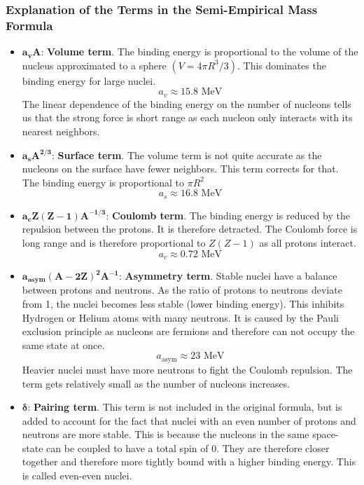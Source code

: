 \subsubsection{Explanation of the Terms in the Semi-Empirical Mass Formula}\label{sssec: Explenation of the Terms in the Semi-Empirical Mass Formula}
\begin{itemize}
    \item $\mathbf{a_vA}$: \textbf{Volume term}. The binding energy is proportional to the volume of the nucleus approximated to a sphere $\left(V = 4πR^3/3\right)$. This dominates the binding energy for large nuclei. 
    \begin{equation}
    a_v ≈ 15.8 \text{ MeV}
    \end{equation}
    The linear dependence of the binding energy on the number of nucleons tells us that the strong force is short range as each nucleon only interacts with its nearest neighbors. 
    \item $\mathbf{a_sA^{2 / 3}}$: \textbf{Surface term}. The volume term is not quite accurate as the nucleons on the surface have fewer neighbors. This term corrects for that. The binding energy is proportional to $πR^2$
    \begin{equation}
    a_s ≈ 16.8 \text{ MeV}
    \end{equation} 
    \item $\mathbf{a_cZ(Z-1)A^{-1 / 3}}$: \textbf{Coulomb term}. The binding energy is reduced by the repulsion between the protons. It is therefore detracted. The Coulomb force is long range and is therefore proportional to $Z(Z-1)$ as all protons interact. 
    \begin{equation}
    a_c ≈ 0.72 \text{ MeV}
    \end{equation}
    \item $\mathbf{a_{\text{asym}}(A-2Z)^2A^{-1}}$: \textbf{Asymmetry term}. Stable nuclei have a balance between protons and neutrons. As the ratio of protons to neutrons deviate from 1, the nuclei becomes less stable (lower binding energy). This inhibits Hydrogen or Helium atoms with many neutrons. It is caused by the Pauli exclusion principle as nucleons are fermions and therefore can not occupy the same state at once. 
    \begin{equation}
    a_{\text{asym}} ≈ 23 \text{ MeV}
    \end{equation}
    Heavier nuclei must have more neutrons to fight the Coulomb repulsion. The term gets relatively small as the number of nucleons increases. 
    \item $\mathbf{δ}$: \textbf{Pairing term}. This term is not included in the original formula, but is added to account for the fact that nuclei with an even number of protons and neutrons are more stable. This is because the nucleons in the same space-state can be coupled to have a total spin of 0. They are therefore closer together and therefore more tightly bound with a higher binding energy. This is called even-even nuclei. 

\end{itemize}

